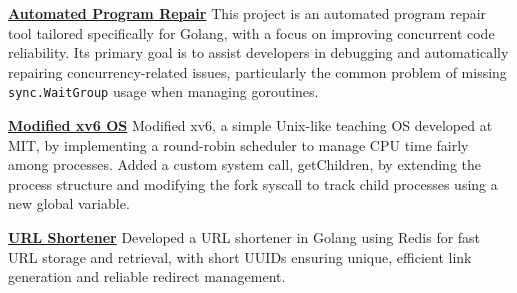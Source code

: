 
\begin{cvparagraph}

    \href{https://github.com/99pouria/automated-program-repair-for-golang?tab=readme-ov-file#automated-program-repair-for-golang}{\faGithubSquare \textbf{ Automated Program Repair}}
    \vspace{0.1cm}
    \newline
    {This project is an automated program repair tool tailored specifically for Golang, with a focus on improving concurrent code reliability. Its primary goal is to assist developers in debugging and automatically repairing concurrency-related issues, particularly the common problem of missing \texttt{sync.WaitGroup} usage when managing goroutines.}
    \vspace{0.2cm}

    \href{https://github.com/99pouria/XV6}{\faGithubSquare \textbf{ Modified xv6 OS}}
    \vspace{0.1cm}
    \newline
    {Modified xv6, a simple Unix-like teaching OS developed at MIT, by implementing a round-robin scheduler to manage CPU time fairly among processes. Added a custom system call, getChildren, by extending the process structure and modifying the fork syscall to track child processes using a new global variable.}
    \vspace{0.2cm}

    \href{https://github.com/99pouria/url-shortener?tab=readme-ov-file#url-shortener}{\faGithubSquare \textbf{ URL Shortener}}
    \vspace{0.1cm}
    \newline
    {Developed a URL shortener in Golang using Redis for fast URL storage and retrieval, with short UUIDs ensuring unique, efficient link generation and reliable redirect management.}

\end{cvparagraph}
